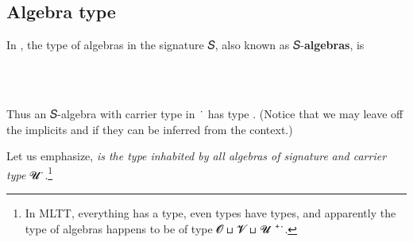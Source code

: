 \documentclass[a4paper,USenglish,cleveref,autoref,thm-restate]{lipics-v2019}
\begin{document}
\subsection{Algebra type}
In \agdaualib, the type of algebras in the signature 𝑆, also known as 𝑆-\textbf{algebras}, is
\begin{code}%
\>[0]\AgdaSpace{}%
\AgdaSymbol{:}\AgdaSpace{}%
\AgdaSymbol{(}\AgdaSpace{}%
\AgdaSymbol{:}\AgdaSpace{}%
\AgdaSymbol{)\{}\AgdaSpace{}%
\AgdaSpace{}%
\AgdaSymbol{:}\AgdaSpace{}%
\AgdaSymbol{\}}\AgdaSpace{}%
\AgdaSymbol{(}\AgdaSpace{}%
\AgdaSymbol{:}\AgdaSpace{}%
\AgdaSpace{}%
\AgdaSpace{}%
\AgdaSymbol{)}\AgdaSpace{}%
\AgdaSpace{}%
\AgdaSpace{}%
\AgdaSpace{}%
\AgdaSpace{}%
\AgdaSpace{}%
\AgdaSpace{}%
\AgdaSpace{}%
\<%
\\
%
\\[\AgdaEmptyExtraSkip]%
\>[0]\AgdaSpace{}%
\AgdaSpace{}%
\AgdaSymbol{\{}\AgdaSymbol{\}\{}\AgdaSymbol{\}}\AgdaSpace{}%
\AgdaSpace{}%
\AgdaSymbol{=}\AgdaSpace{}%
\AgdaSpace{}%
\AgdaSpace{}%
\AgdaSpace{}%
\AgdaSpace{}%
\AgdaSpace{}%
\AgdaFunction{,}\AgdaSpace{}%
\AgdaSymbol{((}\AgdaSpace{}%
\AgdaSymbol{:}\AgdaSpace{}%
\AgdaSpace{}%
\AgdaSpace{}%
\AgdaSymbol{)}\AgdaSpace{}%
\AgdaSpace{}%
\AgdaSpace{}%
\AgdaSymbol{(}\AgdaSpace{}%
\AgdaSpace{}%
\AgdaSpace{}%
\AgdaSymbol{)}\AgdaSpace{}%
\AgdaSymbol{)}\<%
\end{code}
Thus an 𝑆-algebra with carrier type in ~̇ has type \algebraUS.  (Notice that we may leave off the implicits  and  if they can be inferred from the context.)

Let us emphasize, \algebraUS \emph{is the type inhabited by all algebras of signature}  \emph{and carrier type} \ab 𝓤\ ̇.\footnote{In MLTT, everything has a type, even types have types, and apparently the type \algebraUS of algebras happens to be of type \ab 𝓞 ⊔ \ab 𝓥 ⊔  \ab 𝓤\ ⁺\ ̇.}
\end{document}

